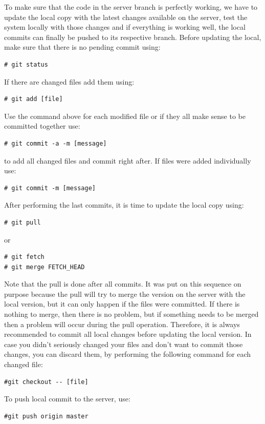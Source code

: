 \documentclass[envcountsame,envcountchap]{svmono}
\begin{document}
To make sure that the code in the server branch is perfectly working, we have to update the local copy with the latest changes available on the server, test the system locally with those changes and if everything is working well, the local commits can finally be pushed to its respective branch. Before updating the local, make sure that there is no pending commit using:
\begin{verbatim}
# git status
\end{verbatim}
If there are changed files add them using:
\begin{verbatim}
# git add [file]
\end{verbatim}
Use the command above for each modified file or if they all make sense to be committed together use:
\begin{verbatim}
# git commit -a -m [message]
\end{verbatim}
to add all changed files and commit right after. If files were added individually use:
\begin{verbatim}
# git commit -m [message]
\end{verbatim}

After performing the last commits, it is time to update the local copy using:
\begin{verbatim}
# git pull
\end{verbatim}
or
\begin{verbatim}
# git fetch
# git merge FETCH_HEAD
\end{verbatim}

Note that the pull is done after all commits. It was put on this sequence on purpose because the pull will try to merge the version on the server with the local version, but it can only happen if the files were committed. If there is nothing to merge, then there is no problem, but if something needs to be merged then a problem will occur during the pull operation. Therefore, it is always recommended to commit all local changes before updating the local version. In case you didn't seriously changed your files and don't want to commit those changes, you can discard them, by performing the following command for each changed file:

\begin{verbatim}
#git checkout -- [file]
\end{verbatim}

To push local commit to the server, use:

\begin{verbatim}
#git push origin master
\end{verbatim}
\end{document}
